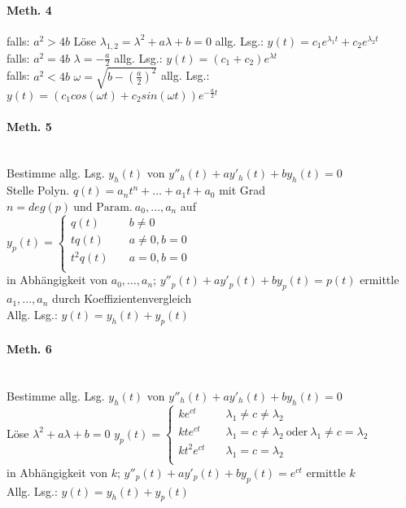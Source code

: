 \documentclass[paper=a3,paper=landscape, fontsize=9pt,DIV=25]{scrartcl}
\begin{document}
\begin{multicols*}{4}
  \paragraph{Meth. 4}

  falls: $a^2>4b$ Löse $\lambda_{1,2}=\lambda^2+a\lambda + b = 0$
  allg. Lsg.: $y(t)=c_1e^{\lambda_1t}+c_2e^{\lambda_2t}$ \\
  falls: $a^2=4b$ $\lambda = - \frac{a}{2}$
  allg. Lsg.: $y(t)=(c_1+c_2)e^{\lambda t}$\\
  falls: $a^2<4b$ $\omega = \sqrt{b - (\frac{a}{2})^2}$
  allg. Lsg.: $y(t)=(c_1cos(\omega t) + c_2sin(\omega t))e^{-\frac{a}{2}t}$

  \paragraph{Meth. 5}\hspace{0pt}\\

  Bestimme allg. Lsg. $y_h(t)$ von $y''_h(t)+ay'_h(t)+by_h(t)=0$\\
  Stelle Polyn. $q(t)=a_nt^n+\dots+a_1t+a_0$ mit Grad $n=deg(p) \ \text{und Param.}\ a_0,\dots,a_n$ auf \\
  $y_p(t) =
  \begin{cases}
    q(t)    & \quad b \neq 0 \\
    tq(t)   & \quad a \neq 0, b = 0\\
    t^2q(t) & \quad a = 0, b = 0\\
  \end{cases}
  $ \\
  in Abhängigkeit von $a_0,\dots ,a_n$;
  $y''_p(t)+ay'_p(t)+by_p(t)=p(t)$
  ermittle $a_1,\dots,a_n$ durch Koeffizientenvergleich \\
  Allg. Lsg.: $y(t)=y_h(t)+y_p(t)$


    \paragraph{Meth. 6}\hspace{0pt}\\

  Bestimme allg. Lsg. $y_h(t)$ von $y''_h(t)+ay'_h(t)+by_h(t)=0$\\
  Löse $\lambda^2+a\lambda+b=0$
  $y_p(t) =
  \begin{cases}
    ke^{ct}    & \quad \lambda_1 \neq c \neq \lambda_2 \\
    kte^{ct}   & \quad \lambda_1 = c \neq \lambda_2 \ \text{oder}\ \lambda_1 \neq c = \lambda_2 \\
    kt^2e^{ct} & \quad  \lambda_1 = c = \lambda_2 \\
  \end{cases}
  $ \\
  in Abhängigkeit von $k$;
  $y''_p(t)+ay'_p(t)+by_p(t)=e^{ct}$
  ermittle $k$\\
  Allg. Lsg.: $y(t)=y_h(t)+y_p(t)$
  
\end{multicols*}
\end{document}
